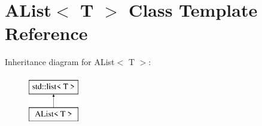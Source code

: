 \hypertarget{class_a_list}{}\section{A\+List$<$ T $>$ Class Template Reference}
\label{class_a_list}
Inheritance diagram for A\+List$<$ T $>$\+:\begin{figure}[H]
\begin{center}
\leavevmode
\includegraphics[height=2.000000cm]{class_a_list}
\end{center}
\end{figure}
